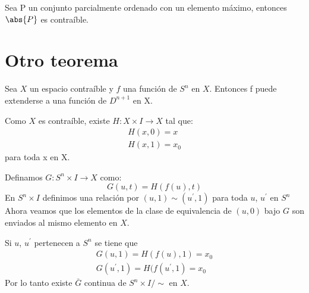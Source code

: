 \begin{Col}
Sea P un conjunto parcialmente ordenado con un elemento máximo, entonces $\abs{P}$ es contraíble.
\end{Col}
\section{Otro teorema}
\begin{Teo}
Sea $X$ un espacio contraíble y $f$ una función de $S^n$ en $X$. Entonces f puede extenderse a una función de $D^{n+1}$ en X.
\end{Teo}
 
\begin{Dem}
Como $X$ es contraíble, existe $H\colon X\times I \rightarrow X$ tal que:
\begin{eqnarray}
H(x,0)=x \\
H(x,1) = x_0
\end{eqnarray}
para toda x en X.

Definamos $G\colon S^n\times I \rightarrow X$ como:
\begin{equation}
G(u,t) = H(f(u),t)
\end{equation}
En $S^n\times I$ definimos una relación por $(u,1)\sim(u^{'},1)$ para toda $u$, $u^{'}$ en $S^n$
Ahora veamos que los elementos de la clase de equivalencia de $(u,0)$ bajo $G$ son enviados al mismo elemento en $X$.

Si $u$, $u^{'}$ pertenecen a $S^n$ se tiene que
\begin{eqnarray}
G(u,1) = H(f(u),1) = x_0\\
G(u^{'},1)=H(f(u^{'},1) = x_0
\end{eqnarray}
Por lo tanto existe $\bar{G}$ continua de $S^n\times I /{\sim}$ en $X$.
\end{Dem}